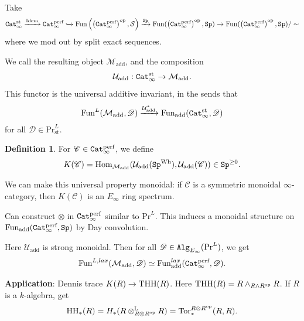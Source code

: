 \documentclass[12pt]{amsart}
\theoremstyle{definition}
\newtheorem{definition}[theorem]{Definition}
\let\smashprod\wedge
\providecommand{\Sp}{\texttt{Sp}}
\providecommand{\Sp}{\text{Sp}}
\providecommand{\st}{\text{st}}
\providecommand{\Pr}{\text{Pr}}
\providecommand{\Idem}{\text{Idem}}
\providecommand{\Wh}{\text{Wh}}
\providecommand{\add}{\text{add}}
\begin{document}
Take
\begin{align*}
    \Cat_\infty^\st \xto{\Idem}\Cat_\infty^\perf \hookto \Fun \left( \left( \Cat_\infty^\perf \right)^\op, \mathcal{S} \right) \xto{\Sp} \Fun(\left( \Cat_\infty^\perf \right)^\op, \Sp) \to \Fun(\left( \Cat_\infty^\perf \right)^\op, \Sp)/\sim
\end{align*}
where we mod out by split exact sequences.

We call the resulting object $\mathcal{M}_\add$, and the composition
\begin{align*}
    \mathcal{U}_\add: \Cat_\infty^\st \to \mathcal{M}_\add.
\end{align*}
This functor is the universal additive invariant, in the sends that
\begin{align*}
    \Fun^L(\mathcal{M}_\add, \mathscr{D}) \xto{\mathcal{U}_\add^\ast}\Fun_\add (\Cat_\infty^\st, \mathscr{D})
\end{align*}
for all $\mathscr{D}\in \Pr^L_\st$.

\begin{definition} For $\mathscr{C}\in \texttt{Cat}_\infty^{\text{perf}}$, we define
\begin{align*}
    K(\mathscr{C}) = \Hom_{\mathcal{M}_\add}(\mathcal{U}_\add(\Sp^\Wh), \mathcal{U}_\add(\mathscr{C})) \in \Sp^{\ge 0}.
\end{align*}
\end{definition}

We can make this universal property monoidal: if $\mathscr{C}$ is a symmetric monoidal $\infty$-category, then $K(\mathscr{C})$ is an $E_\infty$ ring spectrum.

Can construct $\otimes$ in $\texttt{Cat}_\infty^{\text{perf}}$ similar to $\Pr^L$. This induces a monoidal structure on $\Fun_\add(\Cat_\infty^\perf, \Sp)$ by Day convolution.

Here $\mathcal{U}_\add$ is strong monoidal. Then for all $\mathscr{D}\in \Alg_{E_\infty}(\Pr^L)$, we get
\begin{align*}
    \Fun^{L,lax}(\mathcal{M}_\add, \mathscr{D})\simeq \Fun_\add^{lax}(\Cat_\infty^\perf, \mathscr{D}).
\end{align*}

\textbf{Application}: Dennis trace $K(R) \to \text{THH}(R)$. Here $\THH(R) = R \smashprod_{R \smashprod R^\op} R$. If $R$ is a $k$-algebra, get
\begin{align*}
    \text{HH}_\ast(R) = H_\ast(R \otimes_{R \otimes R^{\text{op}}}^{\mathbb{L}} R) = \text{Tor}_\ast^{R \otimes R^{\text{op}}}(R,R).
\end{align*}
\end{document}
